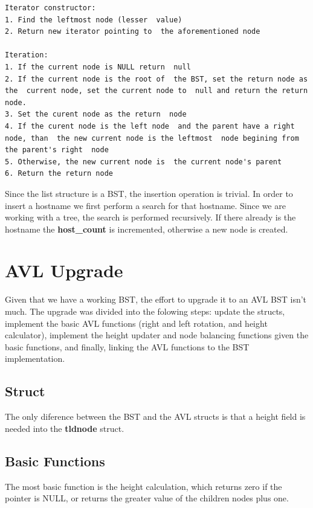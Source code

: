 \documentclass[twocolumn,10pt]{article}
\begin{document}
 
\begin{lstlisting}[caption={Iteration strategy}, label=lst:iter]
Iterator constructor:
1. Find the leftmost node (lesser  value)
2. Return new iterator pointing to  the aforementioned node

Iteration:
1. If the current node is NULL return  null
2. If the current node is the root of  the BST, set the return node as the  current node, set the current node to  null and return the return node.
3. Set the curent node as the return  node
4. If the curent node is the left node  and the parent have a right node, than  the new current node is the leftmost  node begining from the parent's right  node
5. Otherwise, the new current node is  the current node's parent
6. Return the return node

\end{lstlisting}

Since the list structure is a BST, the insertion operation is trivial. In order to insert a hostname we first perform a search for that hostname. Since we are working with a tree, the search is performed recursively. If there already is the hostname the \textbf{host\_{}count} is incremented, otherwise a new node is created.

\section{AVL Upgrade}

Given that we have a working BST, the effort to upgrade it to an AVL BST isn't much. The upgrade was divided into the folowing steps: update the structs, implement the basic AVL functions (right and left rotation, and height calculator), implement the height updater and node balancing functions given the basic functions, and finally, linking the AVL functions to the BST implementation.

\subsection{Struct}

The only diference between the BST and the AVL structs is that a height field is needed into the \textbf{tldnode} struct.

\subsection{Basic Functions}

The most basic function is the height calculation, which returns zero if the pointer is NULL, or returns the greater value of the children nodes plus one.
\end{document}

